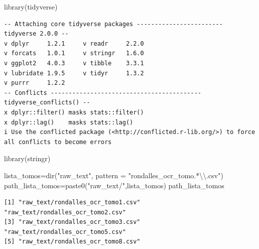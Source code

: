 \documentclass[
  letterpaper,
  DIV=11,
  numbers=noendperiod]{scrreprt}
\newenvironment{Shaded}{\begin{snugshade}}{\end{snugshade}}
\newcommand{\AttributeTok}[1]{\textcolor[rgb]{0.40,0.45,0.13}{#1}}
\newcommand{\FunctionTok}[1]{\textcolor[rgb]{0.28,0.35,0.67}{#1}}
\newcommand{\NormalTok}[1]{\textcolor[rgb]{0.00,0.23,0.31}{#1}}
\newcommand{\OtherTok}[1]{\textcolor[rgb]{0.00,0.23,0.31}{#1}}
\newcommand{\SpecialCharTok}[1]{\textcolor[rgb]{0.37,0.37,0.37}{#1}}
\newcommand{\StringTok}[1]{\textcolor[rgb]{0.13,0.47,0.30}{#1}}
\begin{document}
\begin{Shaded}
\begin{Highlighting}[]
\FunctionTok{library}\NormalTok{(tidyverse)}
\end{Highlighting}
\end{Shaded}

\begin{verbatim}
-- Attaching core tidyverse packages ------------------------ tidyverse 2.0.0 --
v dplyr     1.2.1     v readr     2.2.0
v forcats   1.0.1     v stringr   1.6.0
v ggplot2   4.0.3     v tibble    3.3.1
v lubridate 1.9.5     v tidyr     1.3.2
v purrr     1.2.2     
-- Conflicts ------------------------------------------ tidyverse_conflicts() --
x dplyr::filter() masks stats::filter()
x dplyr::lag()    masks stats::lag()
i Use the conflicted package (<http://conflicted.r-lib.org/>) to force all conflicts to become errors
\end{verbatim}

\begin{Shaded}
\begin{Highlighting}[]
\FunctionTok{library}\NormalTok{(stringr)}

\NormalTok{lista\_tomos}\OtherTok{=}\FunctionTok{dir}\NormalTok{(}\StringTok{"raw\_text"}\NormalTok{, }\AttributeTok{pattern =} \StringTok{"rondalles\_ocr\_tomo.*}\SpecialCharTok{\textbackslash{}\textbackslash{}}\StringTok{.csv"}\NormalTok{)}
\NormalTok{path\_lista\_tomos}\OtherTok{=}\FunctionTok{paste0}\NormalTok{(}\StringTok{"raw\_text/"}\NormalTok{,lista\_tomos)}
\NormalTok{path\_lista\_tomos}
\end{Highlighting}
\end{Shaded}

\begin{verbatim}
[1] "raw_text/rondalles_ocr_tomo1.csv" "raw_text/rondalles_ocr_tomo2.csv"
[3] "raw_text/rondalles_ocr_tomo3.csv" "raw_text/rondalles_ocr_tomo5.csv"
[5] "raw_text/rondalles_ocr_tomo8.csv"
\end{verbatim}
\end{document}
